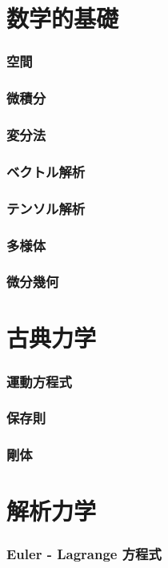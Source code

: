 \documentclass[dvipdfmx,uplatex]{jsarticle}
\begin{document}
  \setcounter{tocdepth}{3}
  \tableofcontents
  \clearpage

  \part{数学的基礎}
  \section{空間}
  \section{微積分}
  \section{変分法}
  \section{ベクトル解析}
  \section{テンソル解析}
  \section{多様体}
  \section{微分幾何}
  \newpage

  \part{古典力学}
  \section{運動方程式}
  \section{保存則}
  \section{剛体}
  \newpage

  \part{解析力学}
  \section{Euler - Lagrange 方程式}
\end{document}
